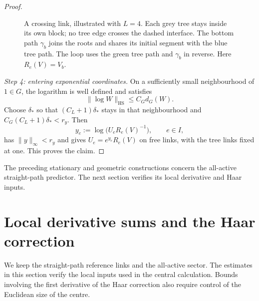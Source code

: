 \documentclass[10pt,reqno]{amsart}
\theoremstyle{definition}
\theoremstyle{remark}
\numberwithin{equation}{section}
\numberwithin{figure}{section}
\begin{document}
\begin{proof}
\begin{figure}[htbp]
\caption{A crossing link, illustrated with $L=4$. Each grey tree stays
inside its own block; no tree edge crosses the dashed interface.
The bottom path $\gamma_b$ joins the roots and shares its initial segment
with the blue tree path. The loop uses the green tree path and $\gamma_b$
in reverse. Here $R_e(V)=V_b$.}
\label{fig:crossing-chart-entry-loop}
\end{figure}

\emph{Step 4: entering exponential coordinates.}
On a sufficiently small neighbourhood of $1\in G$, the logarithm is
well defined and satisfies
\begin{equation}\label{eq:local-logarithm-chord-bound}
\|\log W\|_{\mathrm{HS}}\le C_Gd_G(W).
\end{equation}
Choose $\delta_*$ so that $(C_L+1)\delta_*$ stays in that neighbourhood
and $C_G(C_L+1)\delta_*<r_y$. Then
\begin{equation}\label{eq:chart-entry-coordinate-choice}
y_e:=\log\bigl(U_eR_e(V)^{-1}\bigr),\qquad e\in I,
\end{equation}
has $\|y\|_\infty<r_y$ and gives $U_e=e^{y_e}R_e(V)$ on free links,
with the tree links fixed at one. This proves the claim.
\end{proof}

The preceding stationary and geometric constructions concern the
all-active straight-path predictor. The next section verifies its
local derivative and Haar inputs.

\section{Local derivative sums and the Haar correction}\label{sec:local-derivative-inputs}
We keep the straight-path reference links and the all-active sector.
The estimates in this section verify the local inputs used in the
central calculation. Bounds involving the first derivative of the Haar
correction also require control of the Euclidean size of the centre.
\end{document}
